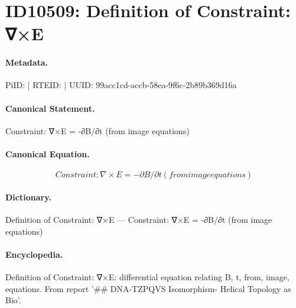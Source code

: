 \section*{ID10509: Definition of Constraint: ∇×E}
\paragraph{Metadata.}
PiID:  | RTEID:  | UUID: 99acc1cd-accb-58ea-9f6c-2b89b369d16a

\paragraph{Canonical Statement.}
Constraint: ∇×E = -∂B/∂t (from image equations)

\paragraph{Canonical Equation.}
\[
Constraint: ∇×E = -∂B/∂t (from image equations)
\]

\paragraph{Dictionary.}
Definition of Constraint: ∇×E — Constraint: ∇×E = -∂B/∂t (from image equations)

\paragraph{Encyclopedia.}
Definition of Constraint: ∇×E: differential equation relating B, t, from, image, equations. From report '\#\# DNA-TZPQVS Isomorphism- Helical Topology as Bio'.
